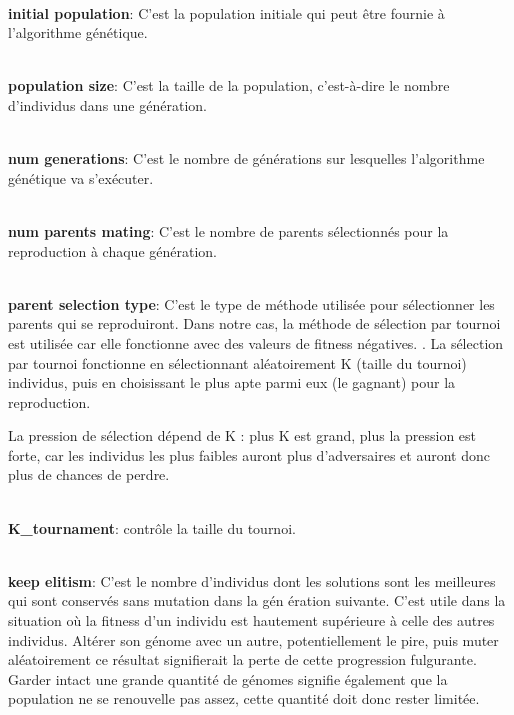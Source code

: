\documentclass[journal, a4paper]{IEEEtran}
\begin{document}
    \\ \textbf{initial population}: C'est la population initiale
	qui peut être fournie à l'algorithme génétique. %

    \\ \textbf{population size}: C'est la taille de la population,
	c'est-à-dire le nombre d'individus dans une génération.

    \\ \textbf{num generations}: C'est le nombre de générations sur
	lesquelles l'algorithme génétique va s'exécuter.

    \\ \textbf{num parents mating}: C'est le nombre de parents
	sélectionnés pour la reproduction à chaque génération.

    \\ \textbf{parent selection type}: C'est le type de méthode
	utilisée pour sélectionner les parents qui se reproduiront.
	Dans notre cas, la méthode de sélection par tournoi est utilisée
	car elle fonctionne avec des valeurs de fitness négatives.
	. La sélection par tournoi fonctionne en sélectionnant
	aléatoirement K (taille du tournoi) individus, puis en choisissant
	le plus apte parmi eux (le gagnant) pour la reproduction.

	La pression de sélection dépend de K : plus K est grand,
	plus la pression est forte, car les individus les plus faibles
	auront plus d'adversaires et auront donc plus de chances de perdre.

	\\ \textbf{K\_tournament}: contrôle la taille du tournoi.

    \\ \textbf{keep elitism}: C'est le nombre d'individus dont les
	solutions sont les meilleures
	qui sont conservés sans mutation dans la gén
	ération suivante. C'est utile dans la situation où la fitness d'un
	individu est hautement supérieure à celle des autres individus.
	Altérer son génome avec un autre, potentiellement le pire, puis
	muter aléatoirement ce résultat signifierait la perte de cette
	progression fulgurante. Garder intact une grande quantité de
	génomes
	signifie également que la population ne se renouvelle pas assez,
	cette quantité doit donc rester limitée.
\end{document}
